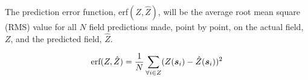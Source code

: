 The prediction error function, erf$(Z,\hat{Z})$, will be the average root mean square (RMS) value for all $N$ field predictions made, point by point, on the actual field, $Z$, and the predicted field, $\hat{Z}$.

\begin{equation}
\text{erf}(Z, \hat{Z}) = \frac{1}{N}\sum_{\forall i \in Z} (Z({\it{\boldsymbol{s}}}_i) - \hat{Z}({\it{\boldsymbol{s}}}_i))^2
\end{equation}






